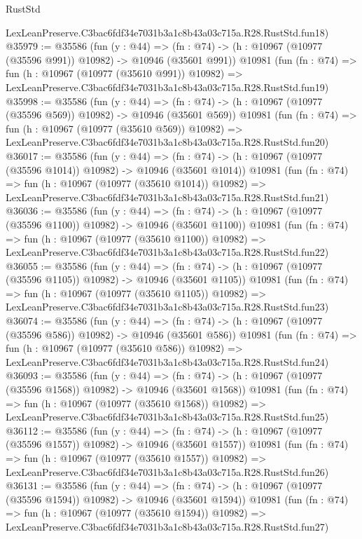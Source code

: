 \begin{lexlean}{RustStd}
\begin{coremodule}
    LexLeanPreserve.C3bac6fdf34e7031b3a1c8b43a03c715a.R28.RustStd.fun18)
@35979 := @35586
    (fun (y : @44) =>
    (fn : @74) -> (h : @10967 (@10977 (@35596 @991)) @10982) -> @10946 (@35601 @991))
    @10981
    (fun (fn : @74) =>
    fun (h : @10967 (@10977 (@35610 @991)) @10982) =>
    LexLeanPreserve.C3bac6fdf34e7031b3a1c8b43a03c715a.R28.RustStd.fun19)
@35998 := @35586
    (fun (y : @44) =>
    (fn : @74) -> (h : @10967 (@10977 (@35596 @569)) @10982) -> @10946 (@35601 @569))
    @10981
    (fun (fn : @74) =>
    fun (h : @10967 (@10977 (@35610 @569)) @10982) =>
    LexLeanPreserve.C3bac6fdf34e7031b3a1c8b43a03c715a.R28.RustStd.fun20)
@36017 := @35586
    (fun (y : @44) =>
    (fn : @74) -> (h : @10967 (@10977 (@35596 @1014)) @10982) -> @10946 (@35601 @1014))
    @10981
    (fun (fn : @74) =>
    fun (h : @10967 (@10977 (@35610 @1014)) @10982) =>
    LexLeanPreserve.C3bac6fdf34e7031b3a1c8b43a03c715a.R28.RustStd.fun21)
@36036 := @35586
    (fun (y : @44) =>
    (fn : @74) -> (h : @10967 (@10977 (@35596 @1100)) @10982) -> @10946 (@35601 @1100))
    @10981
    (fun (fn : @74) =>
    fun (h : @10967 (@10977 (@35610 @1100)) @10982) =>
    LexLeanPreserve.C3bac6fdf34e7031b3a1c8b43a03c715a.R28.RustStd.fun22)
@36055 := @35586
    (fun (y : @44) =>
    (fn : @74) -> (h : @10967 (@10977 (@35596 @1105)) @10982) -> @10946 (@35601 @1105))
    @10981
    (fun (fn : @74) =>
    fun (h : @10967 (@10977 (@35610 @1105)) @10982) =>
    LexLeanPreserve.C3bac6fdf34e7031b3a1c8b43a03c715a.R28.RustStd.fun23)
@36074 := @35586
    (fun (y : @44) =>
    (fn : @74) -> (h : @10967 (@10977 (@35596 @586)) @10982) -> @10946 (@35601 @586))
    @10981
    (fun (fn : @74) =>
    fun (h : @10967 (@10977 (@35610 @586)) @10982) =>
    LexLeanPreserve.C3bac6fdf34e7031b3a1c8b43a03c715a.R28.RustStd.fun24)
@36093 := @35586
    (fun (y : @44) =>
    (fn : @74) -> (h : @10967 (@10977 (@35596 @1568)) @10982) -> @10946 (@35601 @1568))
    @10981
    (fun (fn : @74) =>
    fun (h : @10967 (@10977 (@35610 @1568)) @10982) =>
    LexLeanPreserve.C3bac6fdf34e7031b3a1c8b43a03c715a.R28.RustStd.fun25)
@36112 := @35586
    (fun (y : @44) =>
    (fn : @74) -> (h : @10967 (@10977 (@35596 @1557)) @10982) -> @10946 (@35601 @1557))
    @10981
    (fun (fn : @74) =>
    fun (h : @10967 (@10977 (@35610 @1557)) @10982) =>
    LexLeanPreserve.C3bac6fdf34e7031b3a1c8b43a03c715a.R28.RustStd.fun26)
@36131 := @35586
    (fun (y : @44) =>
    (fn : @74) -> (h : @10967 (@10977 (@35596 @1594)) @10982) -> @10946 (@35601 @1594))
    @10981
    (fun (fn : @74) =>
    fun (h : @10967 (@10977 (@35610 @1594)) @10982) =>
    LexLeanPreserve.C3bac6fdf34e7031b3a1c8b43a03c715a.R28.RustStd.fun27)

\end{coremodule}
\end{lexlean}
